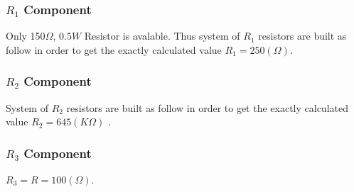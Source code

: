 \documentclass[12pt]{extarticle}
\newcommand{\<}{\langle}
\newcommand\tab[1][1cm]{\hspace*{#1}}
\renewcommand{\>}{\rangle}
\theoremstyle{definition}
\begin{document}
\begin{normalsize}
\subsubsection{$R_1$ Component}
Only 150$\Omega$, $0.5W$ Resistor is avalable. Thus system of $R_1$ resistors are built as follow in order to get the exactly calculated value $R_1 = 250(\Omega)$.
\subsubsection{$R_2$ Component}
System of $R_2$ resistors are built as follow in order to get the exactly calculated value $R_2 = 645(K\Omega)$ .
\subsubsection{$R_3$ Component}
\tab $R_3 = R = 100(\Omega)$.
\end{normalsize}
\end{document}
